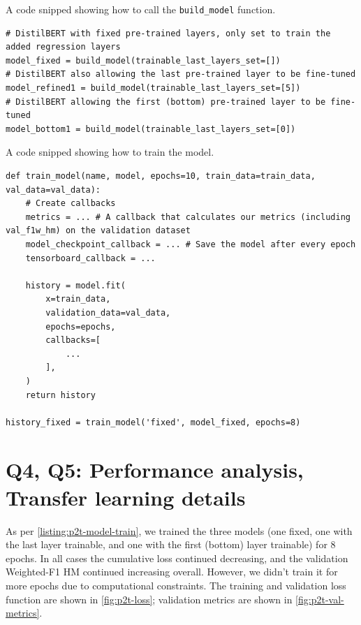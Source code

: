 \begin{listing*}
\caption{A code snipped showing how to call the \texttt{build\_model} function.}
\begin{verbatim}
# DistilBERT with fixed pre-trained layers, only set to train the added regression layers
model_fixed = build_model(trainable_last_layers_set=[])
# DistilBERT also allowing the last pre-trained layer to be fine-tuned
model_refined1 = build_model(trainable_last_layers_set=[5])
# DistilBERT allowing the first (bottom) pre-trained layer to be fine-tuned
model_bottom1 = build_model(trainable_last_layers_set=[0])
\end{verbatim}
\label{listing:p2t-build-model-call}
\end{listing*}

\begin{listing*}
\caption{A code snipped showing how to train the model.}
\begin{verbatim}
def train_model(name, model, epochs=10, train_data=train_data, val_data=val_data):
    # Create callbacks
    metrics = ... # A callback that calculates our metrics (including val_f1w_hm) on the validation dataset
    model_checkpoint_callback = ... # Save the model after every epoch
    tensorboard_callback = ...

    history = model.fit(
        x=train_data,
        validation_data=val_data,
        epochs=epochs,
        callbacks=[
            ...
        ],
    )
    return history

history_fixed = train_model('fixed', model_fixed, epochs=8)
\end{verbatim}
\label{listing:p2t-model-train}
\end{listing*}


\section*{Q4, Q5: Performance analysis, Transfer learning details}

As per \cref{listing:p2t-model-train}, we trained the three models (one fixed, one with the last layer trainable, and one with the first (bottom) layer trainable) for 8 epochs. In all cases the cumulative loss continued decreasing, and the validation Weighted-F1 HM continued increasing overall. However, we didn't train it for more epochs due to computational constraints. The training and validation loss function are shown in \cref{fig:p2t-loss}; validation metrics are shown in \cref{fig:p2t-val-metrics}.

